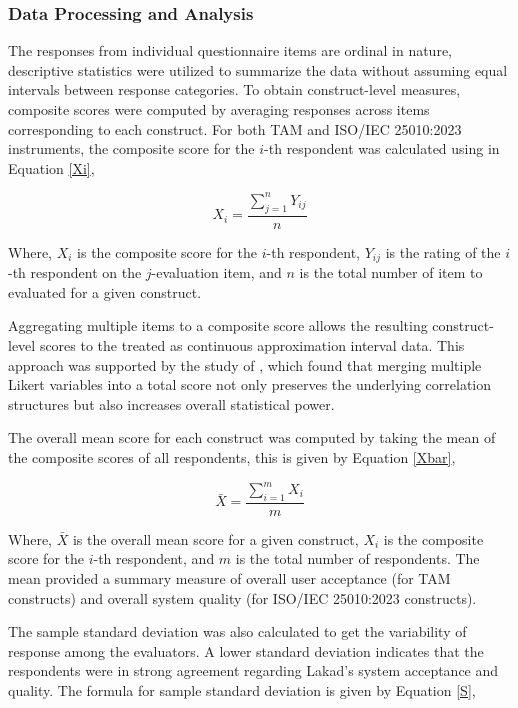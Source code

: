 \subsubsection{Data Processing and Analysis}

The responses from individual questionnaire items are ordinal in nature, descriptive statistics were utilized to summarize the data without assuming equal intervals between response categories. To obtain construct-level measures, composite scores were computed by averaging responses across items corresponding to each construct. For both TAM and ISO/IEC 25010:2023 instruments, the composite score for the $i$-th respondent was calculated using in Equation \ref{Xi},

\begin{equation}
	\label{Xi}
	X_i = \frac{\sum_{j=1}^{n} Y_{ij}}{n}
\end{equation}

Where, $X_{i}$ is the composite score for the $i$-th respondent, $Y_{ij}$ is the rating of the $i$-th respondent on the $j$-evaluation item, and $n$ is the total number of item to evaluated for a given construct. 

Aggregating multiple items to a composite score allows the resulting construct-level scores to the treated as continuous approximation interval data. This approach was supported by the study of \textcite{Huh2025}, which found that merging multiple Likert variables into a total score not only preserves the underlying correlation structures but also increases overall statistical power. 

The overall mean score for each construct was computed by taking the mean of the composite scores of all respondents, this is given by Equation \ref{Xbar},

\begin{equation}
	\label{Xbar}
	\bar{X} = \frac{\sum_{i=1}^{m} X_i}{m}
\end{equation}

Where, $\bar{X}$ is the overall mean score for a given construct, $X_i$ is the composite score for the $i$-th respondent, and $m$ is the total number of respondents. The mean provided a summary measure of overall user acceptance (for TAM constructs) and overall system quality (for ISO/IEC 25010:2023 constructs). 

The sample standard deviation was also calculated to get the variability of response among the evaluators. A lower standard deviation indicates that the respondents were in strong agreement regarding Lakad’s system acceptance and quality.  The formula for sample standard deviation is given by Equation \ref{S},

